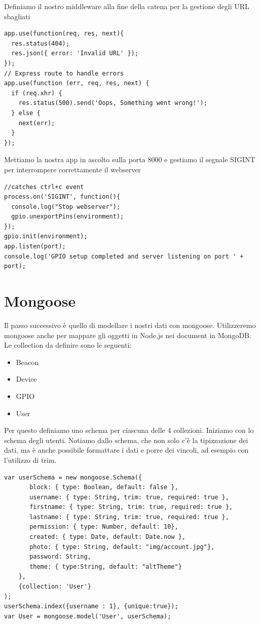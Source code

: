 Definiamo il nostro middleware alla fine della catena per la gestione degli URL sbagliati
\begin{lstlisting}[caption={server.js - middleware}, style=javaScriptCode]
app.use(function(req, res, next){
  res.status(404);
  res.json({ error: 'Invalid URL' });
});
// Express route to handle errors
app.use(function (err, req, res, next) {
  if (req.xhr) {
    res.status(500).send('Oops, Something went wrong!');
  } else {
    next(err);
  }
});
\end{lstlisting}

Mettiamo la nostra app in ascolto sulla porta 8000 e gestiamo il segnale SIGINT per interrompere correttamente il webserver

\begin{lstlisting}[caption={server.js - listen}, style=javaScriptCode]
//catches ctrl+c event
process.on('SIGINT', function(){
  console.log("Stop webserver");
  gpio.unexportPins(environment);
});
gpio.init(environment);
app.listen(port);
console.log('GPIO setup completed and server listening on port ' + port);
\end{lstlisting}

\section{Mongoose}
Il passo successivo è quello di modellare i nostri dati con mongoose.
Utilizzeremo mongoose anche per mappare gli oggetti in Node.js nei document in MongoDB\cite{mongodb}.
Le collection da definire sono le seguenti:
\begin{itemize}
\item Beacon
\item Device
\item GPIO
\item User
\end{itemize}

Per questo definiamo uno schema per ciascuna delle 4 collezioni. 
Iniziamo con lo schema degli utenti. 
Notiamo dallo schema, che non solo c'è la tipizzazione dei dati, ma è anche possibile formattare i dati e porre dei vincoli, ad esempio con l'utilizzo di trim.

\begin{lstlisting}[caption={userSchema}, style=javaScriptCode]
var userSchema = new mongoose.Schema({
       block: { type: Boolean, default: false },
       username: { type: String, trim: true, required: true },
       firstname: { type: String, trim: true, required: true },
       lastname: { type: String, trim: true, required: true },
       permission: { type: Number, default: 10},
       created: { type: Date, default: Date.now },
       photo: { type: String, default: "img/account.jpg"},
       password: String,
       theme: { type:String, default: "altTheme"}
    },
    {collection: 'User'}
);
userSchema.index({username : 1}, {unique:true});
var User = mongoose.model('User', userSchema);
\end{lstlisting}

